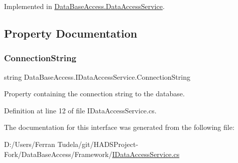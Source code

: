 Implemented in \mbox{\hyperlink{classDataBaseAccess_1_1DataAccessService_a422e6ead446da4cfcdc33255193ac92e}{Data\+Base\+Access.\+Data\+Access\+Service}}.



\subsection{Property Documentation}
\mbox{\label{interfaceDataBaseAccess_1_1IDataAccessService_aced282143a1c60f5cc534af50cf10b32}} 
\subsubsection{\texorpdfstring{ConnectionString}{ConnectionString}}
{\footnotesize\ttfamily string Data\+Base\+Access.\+I\+Data\+Access\+Service.\+Connection\+String\hspace{0.3cm}{\ttfamily [get]}}



Property containing the connection string to the database. 



Definition at line 12 of file I\+Data\+Access\+Service.\+cs.



The documentation for this interface was generated from the following file\+:\begin{DoxyCompactItemize}
\item 
D\+:/\+Users/\+Ferran Tudela/git/\+H\+A\+D\+S\+Project-\/\+Fork/\+Data\+Base\+Access/\+Framework/\mbox{\hyperlink{IDataAccessService_8cs}{I\+Data\+Access\+Service.\+cs}}\end{DoxyCompactItemize}
